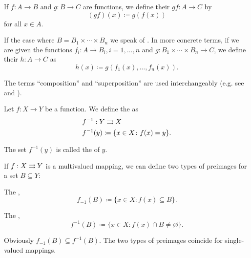 \begin{definition}\label{def:function_composition}
  If \( f: A \to B \) and \( g: B \to C \) are functions, we define their  \( gf: A \to C \) by
  \begin{equation*}
    (gf)(x) \coloneqq g(f(x))
  \end{equation*}
  for all \( x \in A \).

  If the case where \( B = B_1 \times \cdots \times B_n \) we speak of . In more concrete terms, if we are given the functions \( f_i: A \to B_i, i = 1, \ldots, n \) and \( g: B_1 \times \cdots \times B_n \to C \), we define their  \( h: A \to C \) as
  \begin{equation*}
    h(x) \coloneqq g(f_1(x), \ldots, f_n(x)).
  \end{equation*}

  The terms \enquote{composition} and \enquote{superposition} are used interchangeably (e.g. see \cite[44]{Enderton1977} and \cite[]{Фихтенгольц1968/1}).
\end{definition}

\begin{definition}\label{def:function_preimage}
  Let \( f: X \to Y \) be a function. We define the  as
  \begin{align*}
    &f^{-1} : Y \rightrightarrows X \\
    &f^{-1}(y) \coloneqq \{ x \in X \colon f(x) = y \}.
  \end{align*}

  The set \( f^{-1}(y) \) is called the  of \( y \).

  If \( f : X \rightrightarrows Y \) is a multivalued mapping, we can define two types of preimages for a set \( B \subseteq Y \):
  \begin{defenum}
    \item The ,
    \begin{equation*}
      f_{-1}(B) \coloneqq \{ x \in X \colon f(x) \subseteq B \}.
    \end{equation*}

    \item The ,
    \begin{equation*}
      f^{-1}(B) \coloneqq \{ x \in X \colon f(x) \cap B \neq \varnothing \}.
    \end{equation*}
  \end{defenum}

  Obviously \( f_{-1}(B) \subseteq f^{-1}(B) \). The two types of preimages coincide for single-valued mappings.
\end{definition}

